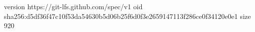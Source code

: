 version https://git-lfs.github.com/spec/v1
oid sha256:d5df36f47c10f53da54630b5d06b25f6d0f3e2659147113f286ce0f34120e0e1
size 920
